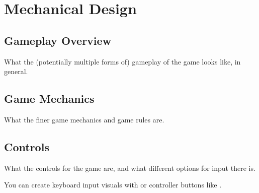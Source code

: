 \section{Mechanical Design}
\subsection{Gameplay Overview}
What the (potentially multiple forms of) gameplay of the game looks like, in general.
\subsection{Game Mechanics}
What the finer game mechanics and game rules are.
\subsection{Controls}
What the controls for the game are, and what different options for input there is.

You can create keyboard input visuals with  or controller buttons like \controllerA.

